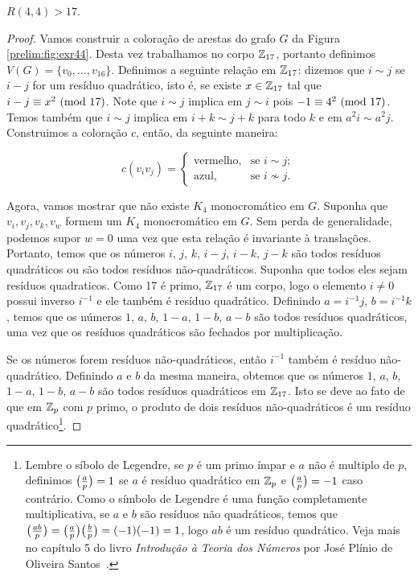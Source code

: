 \begin{proposition}
\label{prelim:thm:exr44}
$R(4,4) > 17$.
\end{proposition}
\begin{proof}
Vamos construir a coloração de arestas do grafo $G$ da Figura \ref{prelim:fig:exr44}. Desta vez trabalhamos no corpo $\mathbb{Z}_{17}$, portanto definimos $V(G) = \{v_0,\dots,v_{16}\}$. Definimos a seguinte relação em $\mathbb{Z}_{17}$: dizemos que $i \sim j$ se $ i - j $ for um resíduo quadrático, isto é, se existe $x \in \mathbb{Z}_{17}$ tal que $i - j \equiv x^2 \ (\text{mod}\ 17)$.
Note que $i \sim j$ implica em $ j \sim i$ pois $-1 \equiv 4^2 \ (\text{mod}\ 17)$. Temos também que $i \sim j$ implica em $i + k \sim j + k$ para todo $k$ e em $a^2 i \sim a^2 j$. Construimos a coloração $c$, então, da seguinte maneira:

\[c(v_i v_j) = \begin{cases}
  \text{vermelho}, & \text{se } i \sim j; \\
  \text{azul}, & \text{se } i \not\sim j.
\end{cases}\]

Agora, vamos mostrar que não existe $K_4$ monocromático em $G$. Suponha que $v_i, v_j, v_k, v_w$ formem um $K_4$ monocromático em $G$. Sem perda de generalidade, podemos supor $w = 0$ uma vez que esta relação é invariante à translações. Portanto, temos que os números $i$, $j$, $k$, $i - j$, $i - k$, $j - k$ são todos resíduos quadráticos ou são todos resíduos não-quadráticos. Suponha que todos eles sejam resíduos quadraticos. Como 17 é primo, $\mathbb{Z}_{17}$ é um corpo, logo o elemento $i \neq 0$ possui inverso $i^{-1}$ e ele também é resíduo quadrático.
Definindo $a = i^{-1}j$, $b = i^{-1}k$, temos que os números $1$, $a$, $b$, $1 - a$, $1- b$, $a - b$ são todos resíduos quadráticos, uma vez que os resíduos quadráticos são fechados por multiplicação.

Se os números forem resíduos não-quadráticos, então $i^{-1}$ também é resíduo não-quadrático. Definindo $a$ e $b$ da mesma maneira, obtemos que os números $1$, $a$, $b$, $1 - a$, $1- b$, $a - b$ são todos resíduos quadráticos em $\mathbb{Z}_{17}$.
Isto se deve ao fato de que em $\mathbb{Z}_{p}$ com $p$ primo, o produto de dois resíduos não-quadráticos é um resíduo quadrático\footnote{Lembre o síbolo de Legendre, se $p$ é um primo ímpar e $a$ não é multiplo de $p$, definimos $\big(\frac{a}{p}\big) = 1$ se $a$ é resíduo quadrático em $\mathbb{Z}_{p}$ e $\big(\frac{a}{p}\big) = -1$ caso contrário.
Como o símbolo de Legendre é uma função completamente multiplicativa, se $a$ e $b$ são resíduos não quadráticos, temos que $\big(\frac{ab}{p}\big) = \big(\frac{a}{p}\big) \big(\frac{b}{p}\big) = (-1)(-1) = 1$, logo $ab$ é um resíduo quadrático. Veja mais no capítulo 5 do livro \emph{Introdução à Teoria dos Números} por José Plínio de Oliveira Santos~\cite{plinio}.}.


\end{proof}
